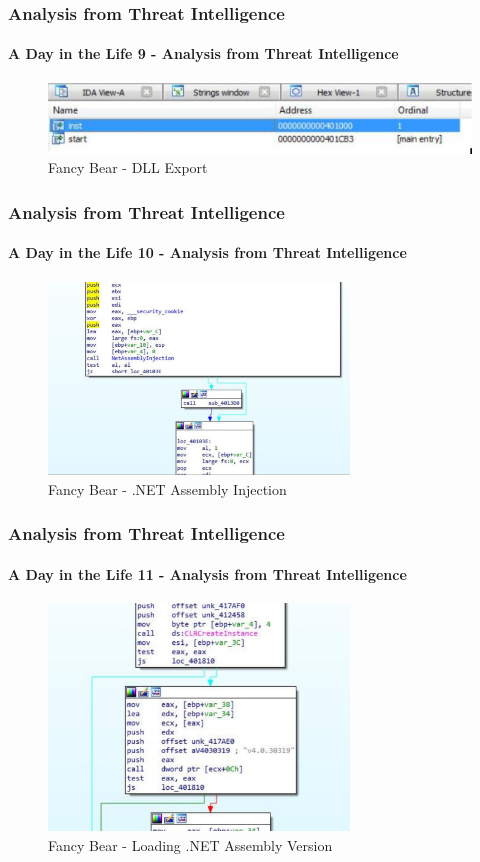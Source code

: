 \documentclass[aspectratio=169]{beamer}
\begin{document}
\begin{frame}
  \frametitle{Analysis from Threat Intelligence}
  \framesubtitle{A Day in the Life 9 - Analysis from Threat Intelligence}
  \begin{center}
    \begin{figure}
      \includegraphics[width=14cm,keepaspectratio]{fancy_bear_analysis_0}
      \caption{Fancy Bear - DLL Export}
    \end{figure}
  \end{center}
\end{frame}

\begin{frame}
  \frametitle{Analysis from Threat Intelligence}
  \framesubtitle{A Day in the Life 10 - Analysis from Threat Intelligence}
  \begin{center}
    \begin{figure}
      \includegraphics[width=8cm,keepaspectratio]{fancy_bear_analysis_1}
      \caption{Fancy Bear - .NET Assembly Injection}
    \end{figure}
  \end{center}
\end{frame}

\begin{frame}
  \frametitle{Analysis from Threat Intelligence}
  \framesubtitle{A Day in the Life 11 - Analysis from Threat Intelligence}
  \begin{center}
    \begin{figure}
      \includegraphics[width=8cm,keepaspectratio]{fancy_bear_analysis_2}
      \caption{Fancy Bear - Loading .NET Assembly Version}
    \end{figure}
  \end{center}
\end{frame}
\end{document}
